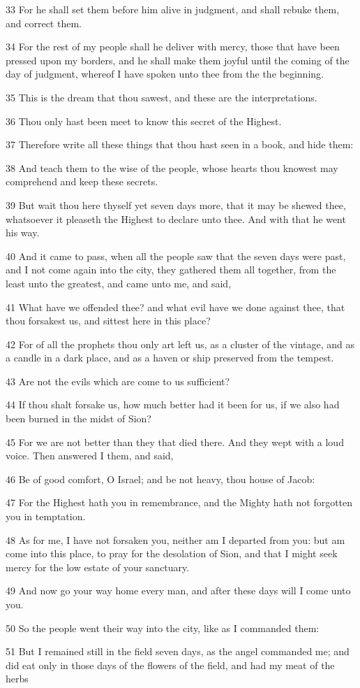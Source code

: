 \par 33 For he shall set them before him alive in judgment, and shall rebuke them, and correct them.
\par 34 For the rest of my people shall he deliver with mercy, those that have been pressed upon my borders, and he shall make them joyful until the coming of the day of judgment, whereof I have spoken unto thee from the the beginning.
\par 35 This is the dream that thou sawest, and these are the interpretations.
\par 36 Thou only hast been meet to know this secret of the Highest.
\par 37 Therefore write all these things that thou hast seen in a book, and hide them:
\par 38 And teach them to the wise of the people, whose hearts thou knowest may comprehend and keep these secrets.
\par 39 But wait thou here thyself yet seven days more, that it may be shewed thee, whatsoever it pleaseth the Highest to declare unto thee. And with that he went his way.
\par 40 And it came to pass, when all the people saw that the seven days were past, and I not come again into the city, they gathered them all together, from the least unto the greatest, and came unto me, and said,
\par 41 What have we offended thee? and what evil have we done against thee, that thou forsakest us, and sittest here in this place?
\par 42 For of all the prophets thou only art left us, as a cluster of the vintage, and as a candle in a dark place, and as a haven or ship preserved from the tempest.
\par 43 Are not the evils which are come to us sufficient?
\par 44 If thou shalt forsake us, how much better had it been for us, if we also had been burned in the midst of Sion?
\par 45 For we are not better than they that died there. And they wept with a loud voice. Then answered I them, and said,
\par 46 Be of good comfort, O Israel; and be not heavy, thou house of Jacob:
\par 47 For the Highest hath you in remembrance, and the Mighty hath not forgotten you in temptation.
\par 48 As for me, I have not forsaken you, neither am I departed from you: but am come into this place, to pray for the desolation of Sion, and that I might seek mercy for the low estate of your sanctuary.
\par 49 And now go your way home every man, and after these days will I come unto you.
\par 50 So the people went their way into the city, like as I commanded them:
\par 51 But I remained still in the field seven days, as the angel commanded me; and did eat only in those days of the flowers of the field, and had my meat of the herbs

